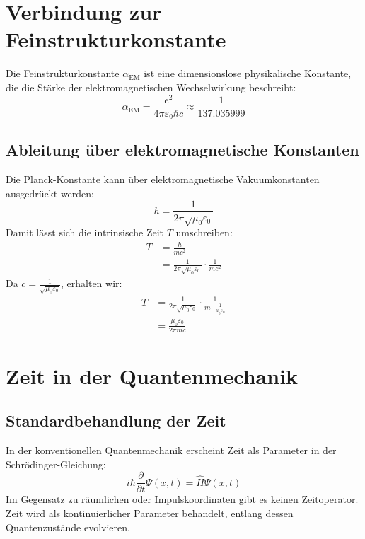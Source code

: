 \documentclass[12pt,a4paper]{article}
\newcommand{\alphaEM}{\alpha_{\text{EM}}}
\begin{document}
	\section{Verbindung zur Feinstrukturkonstante}
	Die Feinstrukturkonstante \( \alphaEM \) ist eine dimensionslose physikalische Konstante, die die Stärke der elektromagnetischen Wechselwirkung beschreibt:
	\begin{equation}
		\alphaEM = \frac{e^2}{4\pi\varepsilon_0\hbar c} \approx \frac{1}{137.035999}
	\end{equation}
	
	\subsection{Ableitung über elektromagnetische Konstanten}
	Die Planck-Konstante kann über elektromagnetische Vakuumkonstanten ausgedrückt werden:
	\begin{equation}
		h = \frac{1}{2\pi\sqrt{\mu_0\varepsilon_0}}
	\end{equation}
	Damit lässt sich die intrinsische Zeit \( T \) umschreiben:
	\begin{align}
		T &= \frac{h}{mc^2} \\
		&= \frac{1}{2\pi\sqrt{\mu_0\varepsilon_0}} \cdot \frac{1}{mc^2}
	\end{align}
	Da \( c = \frac{1}{\sqrt{\mu_0\varepsilon_0}} \), erhalten wir:
	\begin{align}
		T &= \frac{1}{2\pi\sqrt{\mu_0\varepsilon_0}} \cdot \frac{1}{m \cdot \frac{1}{\mu_0\varepsilon_0}} \\
		&= \frac{\mu_0\varepsilon_0}{2\pi m c}
	\end{align}
	
	\section{Zeit in der Quantenmechanik}
	\subsection{Standardbehandlung der Zeit}
	In der konventionellen Quantenmechanik erscheint Zeit als Parameter in der Schrödinger-Gleichung:
	\begin{equation}
		i\hbar \frac{\partial}{\partial t}\Psi(x,t) = \hat{H}\Psi(x,t)
	\end{equation}
	Im Gegensatz zu räumlichen oder Impulskoordinaten gibt es keinen Zeitoperator. Zeit wird als kontinuierlicher Parameter behandelt, entlang dessen Quantenzustände evolvieren.
	
\end{document}
